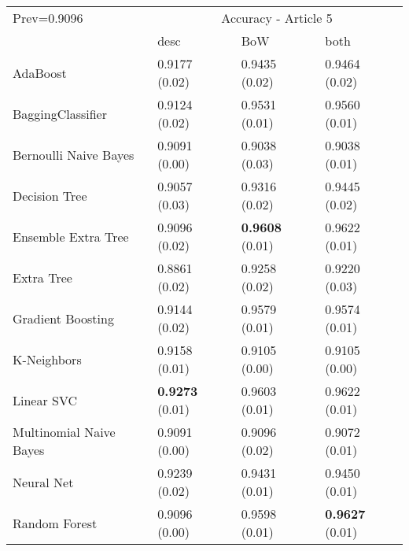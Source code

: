 \begin{tabular}{|l|l|l|l| }
\hline
Prev=0.9096 &  \multicolumn{3}{c|}{Accuracy - Article 5} \\
\cline{2-4} & desc & BoW & both \\ \hline
AdaBoost                & 0.9177 (0.02) & 0.9435 (0.02) & 0.9464 (0.02)\\
BaggingClassifier       & 0.9124 (0.02) & 0.9531 (0.01) & 0.9560 (0.01)\\
Bernoulli Naive Bayes   & 0.9091 (0.00) & 0.9038 (0.03) & 0.9038 (0.01)\\
Decision Tree           & 0.9057 (0.03) & 0.9316 (0.02) & 0.9445 (0.02)\\
Ensemble Extra Tree     & 0.9096 (0.02) & {\bf 0.9608} (0.01) & 0.9622 (0.01)\\
Extra Tree              & 0.8861 (0.02) & 0.9258 (0.02) & 0.9220 (0.03)\\
Gradient Boosting       & 0.9144 (0.02) & 0.9579 (0.01) & 0.9574 (0.01)\\
K-Neighbors             & 0.9158 (0.01) & 0.9105 (0.00) & 0.9105 (0.00)\\
Linear SVC              & {\bf 0.9273} (0.01) & 0.9603 (0.01) & 0.9622 (0.01)\\
Multinomial Naive Bayes & 0.9091 (0.00) & 0.9096 (0.02) & 0.9072 (0.01)\\
Neural Net              & 0.9239 (0.02) & 0.9431 (0.01) & 0.9450 (0.01)\\
Random Forest           & 0.9096 (0.00) & 0.9598 (0.01) & {\bf 0.9627} (0.01)\\
\hline
\end{tabular}
